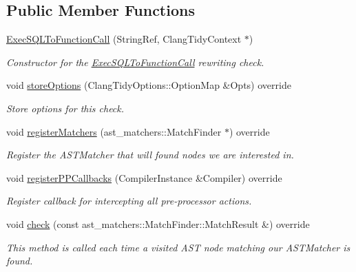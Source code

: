\subsection*{Public Member Functions}
\begin{DoxyCompactItemize}
\item 
\hyperlink{classclang_1_1tidy_1_1pagesjaunes_1_1_exec_s_q_l_to_function_call_a75d4780b9a48eb91ed92fdde28a7214d}{Exec\+S\+Q\+L\+To\+Function\+Call} (String\+Ref, Clang\+Tidy\+Context $\ast$)
\begin{DoxyCompactList}\small\item\em Constructor for the \hyperlink{classclang_1_1tidy_1_1pagesjaunes_1_1_exec_s_q_l_to_function_call}{Exec\+S\+Q\+L\+To\+Function\+Call} rewriting check. \end{DoxyCompactList}\item 
void \hyperlink{classclang_1_1tidy_1_1pagesjaunes_1_1_exec_s_q_l_to_function_call_a632934107a0e957c3f07d61d6729f60e}{store\+Options} (Clang\+Tidy\+Options\+::\+Option\+Map \&Opts) override
\begin{DoxyCompactList}\small\item\em Store options for this check. \end{DoxyCompactList}\item 
void \hyperlink{classclang_1_1tidy_1_1pagesjaunes_1_1_exec_s_q_l_to_function_call_a43d0b0f8abcb795069e164126dfa1db3}{register\+Matchers} (ast\+\_\+matchers\+::\+Match\+Finder $\ast$) override
\begin{DoxyCompactList}\small\item\em Register the A\+S\+T\+Matcher that will found nodes we are interested in. \end{DoxyCompactList}\item 
void \hyperlink{classclang_1_1tidy_1_1pagesjaunes_1_1_exec_s_q_l_to_function_call_a394eba23190a0f6e0b8cebdec7527ea9}{register\+P\+P\+Callbacks} (Compiler\+Instance \&Compiler) override
\begin{DoxyCompactList}\small\item\em Register callback for intercepting all pre-\/processor actions. \end{DoxyCompactList}\item 
void \hyperlink{classclang_1_1tidy_1_1pagesjaunes_1_1_exec_s_q_l_to_function_call_a15f33432a67829e8f95279db8624940f}{check} (const ast\+\_\+matchers\+::\+Match\+Finder\+::\+Match\+Result \&) override
\begin{DoxyCompactList}\small\item\em This method is called each time a visited A\+ST node matching our A\+S\+T\+Matcher is found. \end{DoxyCompactList}\end{DoxyCompactItemize}
